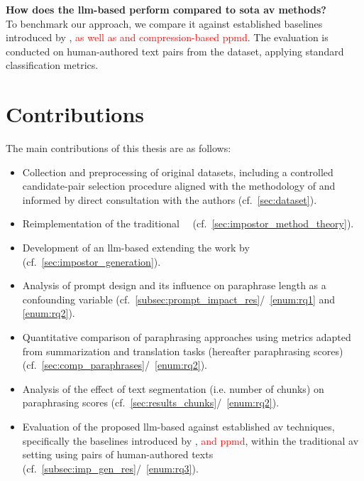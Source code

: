 \begin{questions}
    \item \textbf{How does the \ac{llm}-based \impAppr{} perform compared to \acl{sota} \ac{av} methods?} \label{enum:rq3} \hfill \\
    To benchmark our approach, we compare it against established baselines introduced by \citet{koppel_determining_2014}, \textcolor{red}{as well as \unmasking{} and compression-based \ac{ppmd}}. 
    The evaluation is conducted on human-authored text pairs from the \dataStudent{} dataset, applying standard classification metrics. 
    
\end{questions}



\section{Contributions}
\label{sec:contributions}
The main contributions of this thesis are as follows:
\begin{itemize}
    \item Collection and preprocessing of original datasets, including a controlled candidate-pair selection procedure aligned with the methodology of \citet{koppel_determining_2014} and informed by direct consultation with the authors (cf.~\autoref{sec:dataset}).
    \item Reimplementation of the traditional \impAppr{}~\citep{koppel_determining_2014}\ (cf.~\autoref{sec:impostor_method_theory}).
    \item Development of an \ac{llm}-based \impAppr{} extending the work by \citet{koppel_determining_2014} (cf.~\autoref{sec:impostor_generation}). 
    \item Analysis of prompt design and its influence on paraphrase length as a confounding variable (cf.~\autoref{subsec:prompt_impact_res}/~\ref{enum:rq1} and \ref{enum:rq2}).
    \item Quantitative comparison of paraphrasing approaches using metrics adapted from summarization and translation tasks (hereafter paraphrasing scores) (cf.~\autoref{sec:comp_paraphrases}/~\ref{enum:rq2}).
    \item Analysis of the effect of text segmentation (i.e. number of chunks) on paraphrasing scores (cf.~\autoref{sec:results_chunks}/~\ref{enum:rq2}).
    \item Evaluation of the proposed \ac{llm}-based \impAppr{} against established \ac{av} techniques, specifically the baselines introduced by \citet{koppel_determining_2014}, \textcolor{red}{\unmasking{} and \ac{ppmd}}, within the traditional \ac{av} setting using pairs of human-authored texts (cf.~\autoref{subsec:imp_gen_res}/~\ref{enum:rq3}).
   
\end{itemize}




